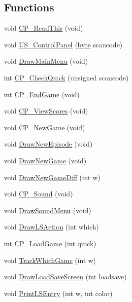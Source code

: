 \subsection*{Functions}
\begin{DoxyCompactItemize}
\item 
void \hyperlink{WL__MENU_8C_a20363b80c8caa7c6be4a2fee67a2d250}{CP\_\-ReadThis} (void)
\item 
void \hyperlink{WL__MENU_8C_ac823c95233ba863de18fe1d9f39caa1e}{US\_\-ControlPanel} (\hyperlink{ID__HEAD_8H_a0c8186d9b9b7880309c27230bbb5e69d}{byte} scancode)
\item 
void \hyperlink{WL__MENU_8C_a37408297ab32e806235fdbc3da553d8d}{DrawMainMenu} (void)
\item 
int \hyperlink{WL__MENU_8C_a95a8089ef599aecc8a81f90ba35032dd}{CP\_\-CheckQuick} (unsigned scancode)
\item 
int \hyperlink{WL__MENU_8C_a36185687b73d760059be35f2c35aaad1}{CP\_\-EndGame} (void)
\item 
void \hyperlink{WL__MENU_8C_a5d2d9c59773600f8b810e6f8a715a21f}{CP\_\-ViewScores} (void)
\item 
void \hyperlink{WL__MENU_8C_a8f189c2d0971b91261fe50e58bc4b64a}{CP\_\-NewGame} (void)
\item 
void \hyperlink{WL__MENU_8C_a41d17005e1b49c4a62b1506b9d213a12}{DrawNewEpisode} (void)
\item 
void \hyperlink{WL__MENU_8C_a4f8733a1d462a92cecf3cff18eb486ba}{DrawNewGame} (void)
\item 
void \hyperlink{WL__MENU_8C_aafd1b4c9e4950fe29a16710ad71376d5}{DrawNewGameDiff} (int w)
\item 
void \hyperlink{WL__MENU_8C_a33c03c428f4fe132d1e5006416422ed4}{CP\_\-Sound} (void)
\item 
void \hyperlink{WL__MENU_8C_a7ecd6a0fd9c404482ff312f2acd68271}{DrawSoundMenu} (void)
\item 
void \hyperlink{WL__MENU_8C_a70ea63f2a40cfe667ba078830e3071d4}{DrawLSAction} (int which)
\item 
int \hyperlink{WL__MENU_8C_a2ca12f5b43c80ee49b36a78621ac8ce4}{CP\_\-LoadGame} (int quick)
\item 
void \hyperlink{WL__MENU_8C_ad95aadf50d120f80e53480d55e7a1824}{TrackWhichGame} (int w)
\item 
void \hyperlink{WL__MENU_8C_ae1fe464efcd5a1d1f43e8dabc2841832}{DrawLoadSaveScreen} (int loadsave)
\item 
void \hyperlink{WL__MENU_8C_acaacbb88f7b7d163245141e126592577}{PrintLSEntry} (int w, int color)

\end{DoxyCompactItemize}
